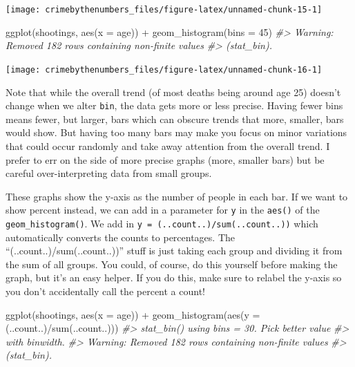 \documentclass[
]{krantz}
\makeatletter
\newenvironment{Shaded}{\begin{snugshade}}{\end{snugshade}}
\newcommand{\AttributeTok}[1]{\textcolor[rgb]{0.61,0.61,0.61}{#1}}
\newcommand{\CommentTok}[1]{\textcolor[rgb]{0.37,0.37,0.37}{\textit{#1}}}
\newcommand{\DecValTok}[1]{\textcolor[rgb]{0.06,0.06,0.06}{#1}}
\newcommand{\FunctionTok}[1]{\textcolor[rgb]{0,0,0}{#1}}
\newcommand{\NormalTok}[1]{#1}
\newcommand{\SpecialCharTok}[1]{\textcolor[rgb]{0,0,0}{#1}}
\newenvironment{kframe}{%
\medskip{}
\setlength{\fboxsep}{.8em}
 \def\at@end@of@kframe{}%
 \ifinner\ifhmode%
  \def\at@end@of@kframe{\end{minipage}}%
  \begin{minipage}{\columnwidth}%
 \fi\fi%
 \def\FrameCommand##1{\hskip\@totalleftmargin \hskip-\fboxsep
 \colorbox{shadecolor}{##1}\hskip-\fboxsep
     \hskip-\linewidth \hskip-\@totalleftmargin \hskip\columnwidth}%
 \MakeFramed {\advance\hsize-\width
   \@totalleftmargin\z@ \linewidth\hsize
   \@setminipage}}%
 {\par\unskip\endMakeFramed%
 \at@end@of@kframe}
\renewenvironment{Shaded}{\begin{kframe}}{\end{kframe}}
\makeatother
\begin{document}
\begin{center}\texttt{[image: crimebythenumbers\_files/figure-latex/unnamed-chunk-15-1]} \end{center}

\begin{Shaded}
\begin{Highlighting}[]
\FunctionTok{ggplot}\NormalTok{(shootings, }\FunctionTok{aes}\NormalTok{(}\AttributeTok{x =}\NormalTok{ age)) }\SpecialCharTok{+} 
  \FunctionTok{geom\_histogram}\NormalTok{(}\AttributeTok{bins =} \DecValTok{45}\NormalTok{)}
\CommentTok{\#\textgreater{} Warning: Removed 182 rows containing non{-}finite values}
\CommentTok{\#\textgreater{} (stat\_bin).}
\end{Highlighting}
\end{Shaded}

\begin{center}\texttt{[image: crimebythenumbers\_files/figure-latex/unnamed-chunk-16-1]} \end{center}

Note that while the overall trend (of most deaths being around age 25) doesn't change when we alter \texttt{bin}, the data gets more or less precise. Having fewer bins means fewer, but larger, bars which can obscure trends that more, smaller, bars would show. But having too many bars may make you focus on minor variations that could occur randomly and take away attention from the overall trend. I prefer to err on the side of more precise graphs (more, smaller bars) but be careful over-interpreting data from small groups.

These graphs show the y-axis as the number of people in each bar. If we want to show percent instead, we can add in a parameter for \texttt{y} in the \texttt{aes()} of the \texttt{geom\_histogram()}. We add in \texttt{y\ =\ (..count..)/sum(..count..))} which automatically converts the counts to percentages. The ``(..count..)/sum(..count..))'' stuff is just taking each group and dividing it from the sum of all groups. You could, of course, do this yourself before making the graph, but it's an easy helper. If you do this, make sure to relabel the y-axis so you don't accidentally call the percent a count!

\begin{Shaded}
\begin{Highlighting}[]
\FunctionTok{ggplot}\NormalTok{(shootings, }\FunctionTok{aes}\NormalTok{(}\AttributeTok{x =}\NormalTok{ age)) }\SpecialCharTok{+} 
  \FunctionTok{geom\_histogram}\NormalTok{(}\FunctionTok{aes}\NormalTok{(}\AttributeTok{y =}\NormalTok{ (..count..)}\SpecialCharTok{/}\FunctionTok{sum}\NormalTok{(..count..)))}
\CommentTok{\#\textgreater{} \textasciigrave{}stat\_bin()\textasciigrave{} using \textasciigrave{}bins = 30\textasciigrave{}. Pick better value}
\CommentTok{\#\textgreater{} with \textasciigrave{}binwidth\textasciigrave{}.}
\CommentTok{\#\textgreater{} Warning: Removed 182 rows containing non{-}finite values}
\CommentTok{\#\textgreater{} (stat\_bin).}
\end{Highlighting}
\end{Shaded}
\end{document}
